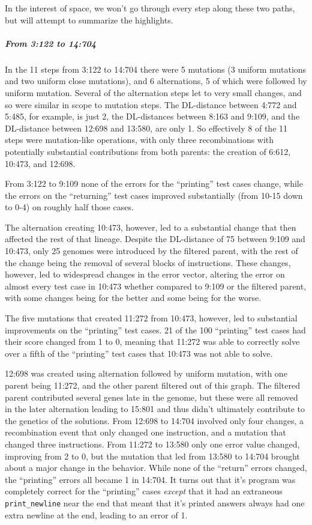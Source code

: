 In the interest of space, we won't go through every step along these two
paths, but will attempt to summarize the highlights.

\subparagraph{From 3:122 to 14:704}

In the 11 steps from 3:122 to 14:704 there were 5 mutations (3 
uniform mutations and two uniform close mutations), and 6 alternations,
5 of which were followed by uniform mutation. Several of the alternation
steps let to very small changes, and so were similar in scope to mutation
steps. The DL-distance between 4:772 and 5:485, for example, is just 2, the
DL-distances between 8:163 and 9:109, and the DL-distance between 12:698 
and 13:580, are only 1. So effectively 8 of the 11 steps were mutation-like
operations, with only three recombinations with potentially substantial
contributions from both parents: the creation of 6:612, 10:473, and 12:698.

From 3:122 to 9:109 none of the errors for the ``printing'' test cases change,
while the errors on the ``returning'' test cases improved substantially
(from 10-15 down to 0-4) on roughly half those cases.

The alternation creating 10:473, however, led to a substantial change that
then affected the rest of that lineage. Despite the DL-distance of 75 between 9:109 and 10:473, only 25 genomes were introduced by the filtered parent,
with the rest of the change being the removal of several blocks of 
instructions. These changes, however, led to widespread changes in the error
vector, altering the error on almost every test case in 10:473 whether 
compared to 9:109 or the filtered parent, with some changes being for the
better and some being for the worse. 

The five mutations that created 11:272 from 10:473, however, led to substantial
improvements on the ``printing'' test cases. 21 of the 100 ``printing'' 
test cases had their score changed from 1 to 0, meaning that 11:272 was able to
correctly solve over a fifth of the ``printing'' test cases that 10:473 was not
able to solve.

12:698 was created using alternation followed by uniform mutation, with one parent being 11:272, and the other parent filtered out of this graph. The 
filtered parent contributed several genes late in the genome, but these were
all removed in the later alternation leading to 15:801 and thus didn't 
ultimately contribute to the genetics of the solutions. From 12:698 to 14:704
involved only four changes, a recombination event that only changed one
instruction, and a mutation that changed three instructions. From 11:272 to 13:580 only one error value changed, improving from 2 to 0, but the mutation
that led from 13:580 to 14:704 brought about a major change in the behavior.
While none of the ``return'' errors changed, the ``printing'' errors all became 1 in
14:704. It turns out that it's program was completely correct for the
``printing'' cases \emph{except} that it had an extraneous 
\texttt{print\_newline} near the end that meant that it's printed answers
always had one extra newline at the end, leading to an error of 1.

